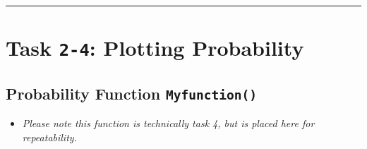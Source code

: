 \documentclass[
  12pt,
]{article}
\providecommand{\tightlist}{%
  \setlength{\itemsep}{0pt}\setlength{\parskip}{0pt}}
\begin{document}
\begin{center}\rule{0.5\linewidth}{0.5pt}\end{center}

\hypertarget{task-2-4-plotting-probability}{%
\section{\texorpdfstring{Task \texttt{2-4}: Plotting
Probability}{Task 2-4: Plotting Probability}}\label{task-2-4-plotting-probability}}

\hypertarget{probability-function-myfunction}{%
\subsection{\texorpdfstring{Probability Function
\texttt{Myfunction()}}{Probability Function Myfunction()}}\label{probability-function-myfunction}}

\begin{itemize}
\tightlist
\item
  \emph{Please note this function is technically task 4, but is placed
  here for repeatability.}
\end{itemize}
\end{document}
